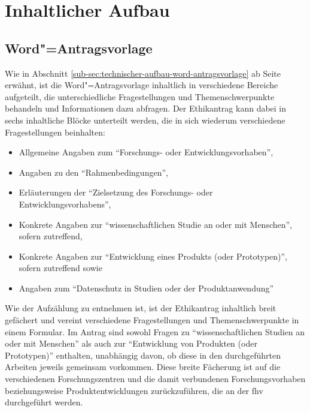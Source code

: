 \documentclass[a4paper,12pt,twoside,numbers=noendperiod]{scrreprt}
\begin{document}
\section{Inhaltlicher Aufbau}
\label{sec:inhaltlicher-aufbau}

\subsection{Word"=Antragsvorlage}
\label{sub-sec:inhaltlicher-aufbau-word-antragsvorlage}

Wie in Abschnitt \ref{sub-sec:technischer-aufbau-word-antragsvorlage} ab Seite \pageref{sub-sec:technischer-aufbau-word-antragsvorlage} erwähnt, ist die Word"=Antragsvorlage inhaltlich in verschiedene Bereiche aufgeteilt, die unterschiedliche Fragestellungen und Themenschwerpunkte behandeln und Informationen dazu abfragen. Der Ethikantrag kann dabei in sechs inhaltliche Blöcke unterteilt werden, die in sich wiederum verschiedene Fragestellungen beinhalten:
\begin{itemize}
    \item Allgemeine Angaben zum \enquote{Forschungs- oder Entwicklungsvorhaben},
    \item Angaben zu den \enquote{Rahmenbedingungen},
    \item Erläuterungen der \enquote{Zielsetzung des Forschungs- oder Entwicklungsvorhabens},
    \item Konkrete Angaben zur \enquote{wissenschaftlichen Studie an oder mit Menschen}, sofern zutreffend,
    \item Konkrete Angaben zur \enquote{Entwicklung eines Produkts (oder Prototypen)}, sofern zutreffend sowie
    \item Angaben zum \enquote{Datenschutz in Studien oder der Produktanwendung}
\end{itemize}

Wie der Aufzählung zu entnehmen ist, ist der Ethikantrag inhaltlich breit gefächert und vereint verschiedene Fragestellungen und Themenschwerpunkte in einem Formular. Im Antrag sind sowohl Fragen zu \enquote{wissenschaftlichen Studien an oder mit Menschen} als auch zur \enquote{Entwicklung von Produkten (oder Prototypen)} enthalten, unabhängig davon, ob diese in den durchgeführten Arbeiten jeweils gemeinsam vorkommen. Diese breite Fächerung ist auf die verschiedenen Forschungszentren und die damit verbundenen Forschungsvorhaben beziehungsweise Produktentwicklungen zurückzuführen, die an der \acl{fhv} durchgeführt werden.
\end{document}
